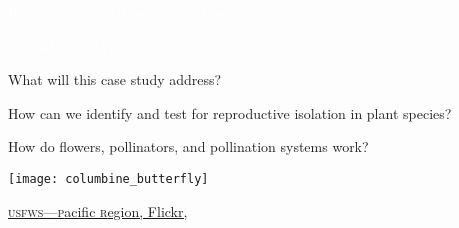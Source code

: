 \documentclass[t,hidelinks]{beamer}
\newcommand{\ques}[1]{\highlight{\textsc{q#1:}}}
\begin{document}
{
\begin{frame}[t]{\textcolor{white}{Reproductive isolation in columbines.}}

\vfilll

\tiny \textcolor{white}{KimonBerlin, Wikimedia }
\end{frame}
}
%
\begin{frame}[t]{What will this case study address?}

	\begin{multicols}{2}
	
	\hangpara How can we identify and test for reproductive isolation in plant species?

	\hangpara How do flowers, pollinators, and pollination systems work?

	\columnbreak
	
	\texttt{[image: columbine\_butterfly]}
	\end{multicols}
	 
	\vfilll
	
	\hfill \tiny \href{https://www.flickr.com/photos/usfwspacific/4812239589}{\textsc{usfws—p}acific \textsc{r}egion, Flickr, }
\end{frame}
%
%		
%
%		
%
%
%
%
%	
%
\end{document}
